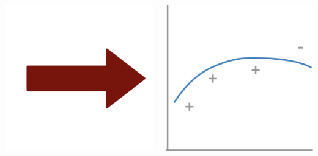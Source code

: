 \documentclass[presentation]{subfiles}
\begin{document}
\begin{frame}[t]
\begin{columns}
\begin{column}{0.16\textwidth}
{\includegraphics[width=\textwidth]{figures/arrow.png}}


\end{column}

\begin{column}{0.16\textwidth}

{\includegraphics[width=\textwidth]{figures/slb_4.png}}


\end{column}
\end{columns}
\end{frame}
\end{document}
